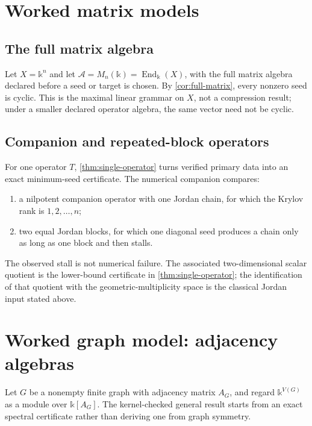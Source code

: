 \documentclass[11pt]{article}
\theoremstyle{definition}
\theoremstyle{remark}
\newcommand{\cA}{\mathcal A}
\newcommand{\End}{\operatorname{End}}
\newcommand{\bbk}{\mathbb{k}}
\begin{document}
\section{Worked matrix models}

\subsection{The full matrix algebra}

Let $X=\bbk^n$ and let $\cA=M_n(\bbk)=\End_{\bbk}(X)$, with the full matrix algebra declared before a seed or target is chosen. By \cref{cor:full-matrix}, every nonzero seed is cyclic. This is the maximal linear grammar on $X$, not a compression result; under a smaller declared operator algebra, the same vector need not be cyclic.

\subsection{Companion and repeated-block operators}

For one operator $T$, \cref{thm:single-operator} turns verified primary data
into an exact minimum-seed certificate.  The numerical companion compares:
\begin{enumerate}[label=(\alph*)]
\item a nilpotent companion operator with one Jordan chain, for which the Krylov rank is $1,2,\ldots,n$;
\item two equal Jordan blocks, for which one diagonal seed produces a chain only as long as one block and then stalls.
\end{enumerate}

The observed stall is not numerical failure.  The associated
two-dimensional scalar quotient is the lower-bound certificate in
\cref{thm:single-operator}; the identification of that quotient with the
geometric-multiplicity space is the classical Jordan input stated above.

\section{Worked graph model: adjacency algebras}

Let $G$ be a nonempty finite graph with adjacency matrix $A_G$, and regard
$\bbk^{V(G)}$ as a module over $\bbk[A_G]$.  The kernel-checked general result
starts from an exact spectral certificate rather than deriving one from graph
symmetry.
\end{document}
